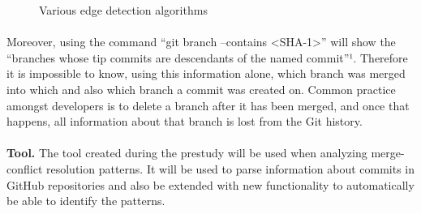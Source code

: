 \begin{figure}[htp]
\begin{center}
  \end{center}
  \caption{Various edge detection algorithms}
  \label{fig:edge}
\end{figure}
\paragraph*{}
Moreover, using the command “git branch --contains <SHA-1>” will show the “branches whose tip commits are descendants of the named commit”¹. Therefore it is impossible to know, using this information alone, which branch was merged into which and also which branch a commit was created on. Common practice amongst developers is to delete a branch after it has been merged, and once that happens, all information about that branch is lost from the Git history.
\paragraph*{}
\textbf{Tool.} The tool created during the prestudy will be used when analyzing merge-conflict resolution patterns. It will be used to parse information about commits in GitHub repositories and also be extended with new functionality to automatically be able to identify the patterns.
